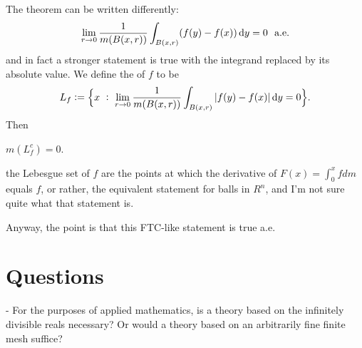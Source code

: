The theorem can be written differently:
\begin{align*}
  \lim_{r \to 0} \frac{1}{m(B(x, r))} \int_{B(x, r)} (f(y) - f(x)) \dy = 0 \ae
\end{align*}
and in fact a stronger statement is true with the integrand replaced by its absolute value. We define the 
of $f$ to be
\begin{align*}
  L_f := \Big\{ x ~:~  \lim_{r \to 0} \frac{1}{m(B(x, r))} \int_{B(x, r)} |f(y) - f(x)| \dy = 0\Big\}.
\end{align*}
Then
\begin{theorem*}
  $m(L_f^c) = 0$.
\end{theorem*}

the Lebesgue set of $f$ are the points at which the derivative of $F(x) = \int_0^x f dm$ equals $f$, or rather,
the equivalent statement for balls in $R^n$, and I'm not sure quite what that statement is.

Anyway, the point is that this FTC-like statement is true a.e.



\section{Questions}

- For the purposes of applied mathematics, is a theory based on the infinitely divisible reals necessary? Or
would a theory based on an arbitrarily fine finite mesh suffice?
